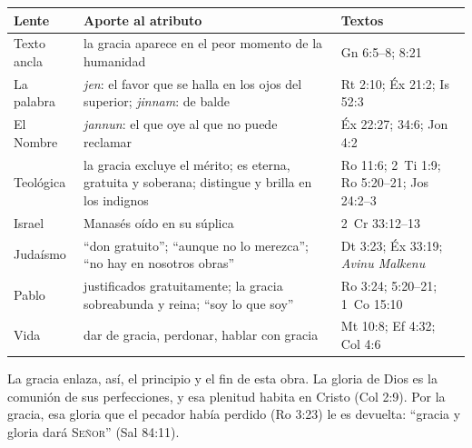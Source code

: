 \documentclass[11pt,letterpaper]{article}
\newcommand{\SENOR}{\textsc{Señor}}
\begin{document}
\begin{center}\small\renewcommand{\arraystretch}{1.22}
\begin{tabular}{@{}L{3.2cm}L{6.8cm}L{4.4cm}@{}}
\toprule
\textbf{Lente} & \textbf{Aporte al atributo} & \textbf{Textos} \\ \midrule
Texto ancla & la gracia aparece en el peor momento de la humanidad & Gn 6:5--8; 8:21 \\
La palabra & \emph{jen}: el favor que se halla en los ojos del superior; \emph{jinnam}: de balde & Rt 2:10; Éx 21:2; Is 52:3 \\
El Nombre & \emph{jannun}: el que oye al que no puede reclamar & Éx 22:27; 34:6; Jon 4:2 \\
Teológica & la gracia excluye el mérito; es eterna, gratuita y soberana; distingue y brilla en los indignos & Ro 11:6; 2~Ti 1:9; Ro 5:20--21; Jos 24:2--3 \\
Israel & Manasés oído en su súplica & 2~Cr 33:12--13 \\
Judaísmo & ``don gratuito''; ``aunque no lo merezca''; ``no hay en nosotros obras'' & Dt 3:23; Éx 33:19; \emph{Avinu Malkenu} \\
Pablo & justificados gratuitamente; la gracia sobreabunda y reina; ``soy lo que soy'' & Ro 3:24; 5:20--21; 1~Co 15:10 \\
Vida & dar de gracia, perdonar, hablar con gracia & Mt 10:8; Ef 4:32; Col 4:6 \\
\bottomrule
\end{tabular}\end{center}

La gracia enlaza, así, el principio y el fin de esta obra. La gloria de Dios es la comunión de sus perfecciones, y esa plenitud habita en Cristo (Col 2:9). Por la gracia, esa gloria que el pecador había perdido (Ro 3:23) le es devuelta: ``gracia y gloria dará \SENOR'' (Sal 84:11).

\end{document}
